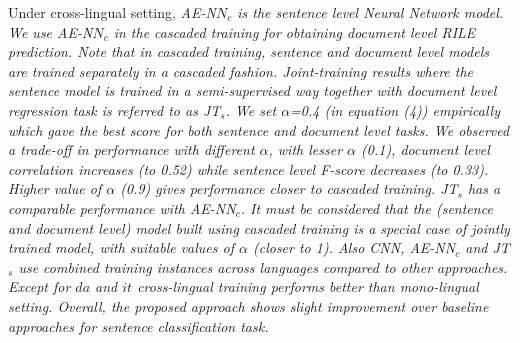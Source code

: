 \documentclass[11pt,a4paper]{article}
\begin{document}
Under cross-lingual setting, \em{AE-N$N_{c}$} \rm is the sentence level Neural Network model. We use \em{AE-N$N_{c}$} \rm in the \textit{cascaded training} for obtaining document level RILE prediction. Note that in \textit{cascaded training}, sentence and document level models are trained separately in a cascaded fashion. Joint-training results where the sentence model is trained in a semi-supervised way together with document level regression task is referred to as \em{JT$_{s}$}\rm. We set  $\alpha$=0.4 (in equation (4)) empirically which gave the best score for both sentence and document level tasks. We observed a trade-off in performance with different $\alpha$, with lesser $\alpha$ (0.1), document level correlation increases (to 0.52) while sentence level F-score decreases (to 0.33). Higher value of $\alpha$ (0.9) gives performance closer to cascaded training. \em{JT$_{s}$} \rm has a comparable performance with \em{AE-NN$_{c}$}. \rm It must be considered that the (sentence and document level) model built using cascaded training is a special case of jointly trained model, with suitable values of $\alpha$ (closer to 1). Also \em{CNN}, \em{AE-NN}$_{c}$ and \em{JT}$_{s}$ \rm use combined training instances across languages compared to other approaches. Except for $da$ and $it$ cross-lingual training performs better than mono-lingual setting. Overall, the proposed approach shows slight improvement over baseline approaches for sentence classification task.
\end{document}
